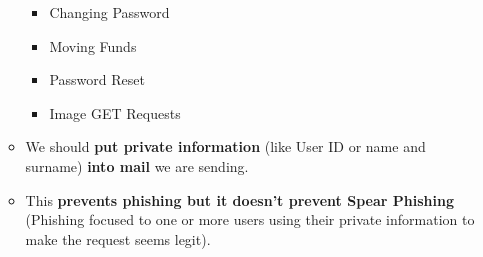 \documentclass[9pt, letterpaper]{article}
\begin{document}
\begin{itemize}
\begin{itemize}
		\begin{itemize}
			\item Changing Password
			\item Moving Funds
			\item Password Reset
			\item Image GET Requests
		\end{itemize}
		\item We should \textbf{put private information} (like User ID or name and surname) \textbf{into mail} we are sending.
		\item This \textbf{prevents phishing but it doesn't prevent Spear Phishing} (Phishing focused to one or more users using their private information to make the request seems legit).
	\end{itemize}
\end{itemize}
\end{document}
